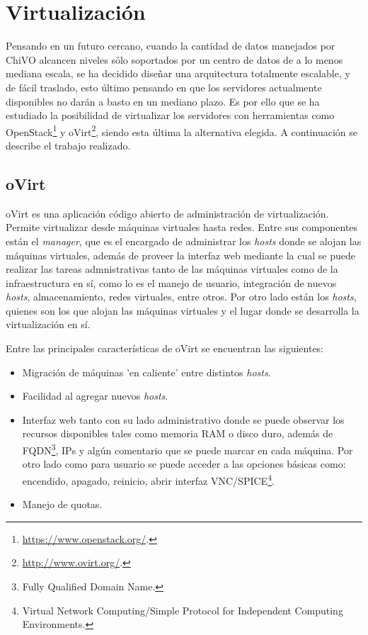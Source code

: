 \section{Virtualización}\label{anx:virtualizacion}

Pensando en un futuro cercano, cuando la cantidad de datos manejados por ChiVO alcancen niveles sólo soportados por un centro de datos de a lo menos mediana escala, se ha decidido diseñar una arquitectura totalmente escalable, y de fácil traslado, esto último pensando en que los servidores actualmente disponibles no darán a basto en un mediano plazo. Es por ello que se ha estudiado la posibilidad de virtualizar los servidores con herramientas como OpenStack\footnote{\url{https://www.openstack.org/}.} y oVirt\footnote{\url{http://www.ovirt.org/}.}, siendo esta última la alternativa elegida. A continuación se describe el trabajo realizado.

\subsection*{oVirt}

oVirt es una aplicación código abierto de administración de virtualización. Permite virtualizar desde máquinas virtuales hasta redes. Entre sus componentes están el \emph{manager}, que es el encargado de administrar los \emph{hosts} donde se alojan las máquinas virtuales, además de proveer la interfaz web mediante la cual se puede realizar las tareas admnistrativas tanto de las máquinas virtuales como de la infraestructura en sí, como lo es el manejo de usuario, integración de nuevos \emph{hosts}, almacenamiento, redes virtuales, entre otros. Por otro lado están los \emph{hosts}, quienes son los que alojan las máquinas virtuales y el lugar donde se desarrolla la virtualización en sí.

Entre las principales características de oVirt se encuentran las siguientes:

\begin{itemize}
	\item Migración de máquinas 'en caliente’ entre distintos \emph{hosts}.
	\item Facilidad al agregar nuevos \emph{hosts}.
	\item Interfaz web tanto con su lado administrativo donde se puede observar los recursos disponibles tales como memoria RAM o disco duro, además de FQDN\footnote{Fully Qualified Domain Name.}, IPs y algún comentario que se puede marcar en cada máquina. Por otro lado como para usuario se puede acceder a las opciones básicas como: encendido, apagado, reinicio, abrir interfaz VNC/SPICE\footnote{Virtual Network Computing/Simple Protocol for Independent Computing Environments.}.
	\item Manejo de quotas.
\end{itemize}

